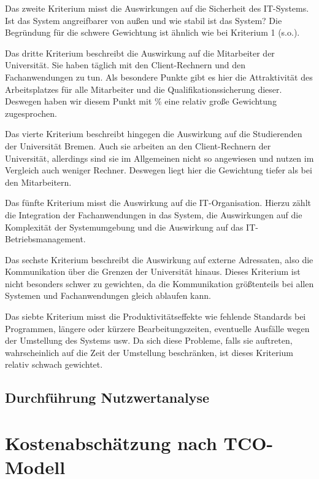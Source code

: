 \documentclass[12pt,utf8]{scrartcl}
\begin{document}
Das zweite Kriterium misst die Auswirkungen auf die Sicherheit des IT-Systems. Ist das System angreifbarer von außen und wie stabil ist das System? Die Begründung für die schwere Gewichtung ist ähnlich wie bei Kriterium 1 (s.o.). 

Das dritte Kriterium beschreibt die Auswirkung auf die Mitarbeiter der Universität. Sie haben täglich mit den Client-Rechnern und den Fachanwendungen zu tun. Als besondere Punkte gibt es hier die Attraktivität des Arbeitsplatzes für alle Mitarbeiter und die Qualifikationssicherung dieser. Deswegen haben wir diesem Punkt mit \% eine relativ große Gewichtung zugesprochen. 

Das vierte Kriterium beschreibt hingegen die Auswirkung auf die Studierenden der Universität Bremen. Auch sie arbeiten an den Client-Rechnern der Universität, allerdings sind sie im Allgemeinen nicht so angewiesen und nutzen im Vergleich auch weniger Rechner. Deswegen liegt hier die Gewichtung tiefer als bei den Mitarbeitern. 

Das fünfte Kriterium misst die Auswirkung auf die IT-Organisation. Hierzu zählt die Integration der Fachanwendungen in das System, die Auswirkungen auf die Komplexität der Systemumgebung und die Auswirkung auf das IT-Betriebsmanagement. 

Das sechste Kriterium beschreibt die Auswirkung auf externe Adressaten, also die Kommunikation über die Grenzen der Universität hinaus. Dieses Kriterium ist nicht besonders schwer zu gewichten, da die Kommunikation größtenteils bei allen Systemen und Fachanwendungen gleich ablaufen kann.

Das siebte Kriterium misst die Produktivitätseffekte wie fehlende Standards bei Programmen, längere oder kürzere Bearbeitungszeiten, eventuelle Ausfälle wegen der Umstellung des Systems usw. Da sich diese Probleme, falls sie auftreten, wahrscheinlich auf die Zeit der Umstellung beschränken, ist dieses Kriterium relativ schwach gewichtet.

\subsection*{Durchführung Nutzwertanalyse}

\section*{Kostenabschätzung nach TCO-Modell}
\end{document}
